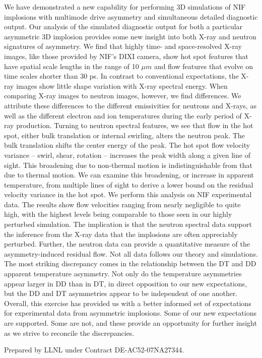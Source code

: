 \documentclass[aip,pop,numerical,reprint,floatfix]{revtex4-1}
\begin{document}
We have demonstrated a new capability for performing 3D simulations
of NIF implosions with multimode drive asymmetry and simultaneous
detailed diagnostic output. Our analysis of the simulated diagnostic
output for both a particular asymmetric 3D implosion provides some
new insight into both X-ray and neutron signatures of asymmetry. We
find that highly time- and space-resolved X-ray images, like those
provided by NIF's DIXI camera, show hot spot features that have spatial
scale lengths in the range of 10 $\mu m$ and flow features that evolve
on time scales shorter than 30 ps. In contrast to conventional expectations,
the X-ray images show little shape variation with X-ray spectral energy.
When comparing X-ray images to neutron images, however, we find differences.
We attribute these differences to the different emissivities for neutrons
and X-rays, as well as the different electron and ion temperatures
during the early period of X-ray production. Turning to neutron spectral
features, we see that flow in the hot spot, either bulk translation
or internal swirling, alters the neutron peak. The bulk translation
shifts the center energy of the peak. The hot spot flow velocity variance
-- swirl, shear, rotation -- increases the peak width along a given
line of sight. This broadening due to non-thermal motion is indistinguishable
from that due to thermal motion. We can examine this broadening, or
increase in apparent temperature, from multiple lines of sight to
derive a lower bound on the residual velocity variance in the hot
spot. We perform this analysis on NIF experimental data. The results
show flow velocities ranging from nearly negligible to quite high,
with the highest levels being comparable to those seen in our highly
perturbed simulation. The implication is that the neutron spectral
data support the inference from the X-ray data that the implosions
are often appreciably perturbed. Further, the neutron data can provide
a quantitative measure of the asymmetry-induced residual flow. Not
all data follows our theory and simulations. The most striking discrepancy
comes in the relationship between the DT and DD apparent temperature
asymmetry. Not only do the temperature asymmetries appear larger in
DD than in DT, in direct opposition to our new expectations, but the
DD and DT asymmetries appear to be independent of one another. Overall,
this exercise has provided us with a better informed set of expectations
for experimental data from asymmetric implosions. Some of our new
expectations are supported. Some are not, and these provide an opportunity
for further insight as we strive to reconcile the discrepancies.

\begin{acknowledgments}
Prepared by LLNL under Contract DE-AC52-07NA27344.
\end{acknowledgments}



\end{document}
